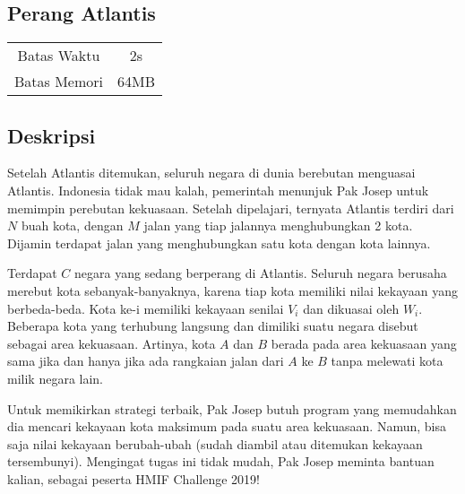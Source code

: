 \documentclass{article}
\begin{document}
\begin{center}
    \section*{Perang Atlantis} %

    \begin{tabular}{ | c c | }
        \hline
        Batas Waktu  & 2s \\    %
        Batas Memori & 64MB \\  %
        \hline
    \end{tabular}
\end{center}

\subsection*{Deskripsi}



Setelah Atlantis ditemukan, seluruh negara di dunia berebutan menguasai Atlantis. Indonesia tidak mau kalah, pemerintah menunjuk Pak Josep untuk memimpin perebutan kekuasaan. 
Setelah dipelajari, ternyata Atlantis terdiri dari $N$ buah kota, dengan $M$ jalan yang tiap jalannya menghubungkan 2 kota. 
Dijamin terdapat jalan yang menghubungkan satu kota dengan kota lainnya.

Terdapat $C$ negara yang sedang berperang di Atlantis. Seluruh negara berusaha merebut kota sebanyak-banyaknya, karena tiap kota memiliki nilai kekayaan yang berbeda-beda. Kota ke-i memiliki kekayaan senilai $V_i$ dan dikuasai oleh $W_i$. Beberapa kota yang terhubung langsung dan dimiliki suatu negara 
disebut sebagai area kekuasaan. Artinya, kota $A$ dan $B$ berada pada area kekuasaan yang sama jika dan hanya jika ada rangkaian jalan dari $A$ ke $B$ tanpa melewati kota milik negara lain.

Untuk memikirkan strategi terbaik, Pak Josep butuh program yang memudahkan dia mencari kekayaan kota maksimum pada suatu area kekuasaan. Namun, bisa saja nilai kekayaan berubah-ubah (sudah diambil atau ditemukan kekayaan tersembunyi). Mengingat tugas ini tidak mudah, Pak Josep meminta bantuan kalian, sebagai peserta HMIF Challenge 2019!


\end{document}
